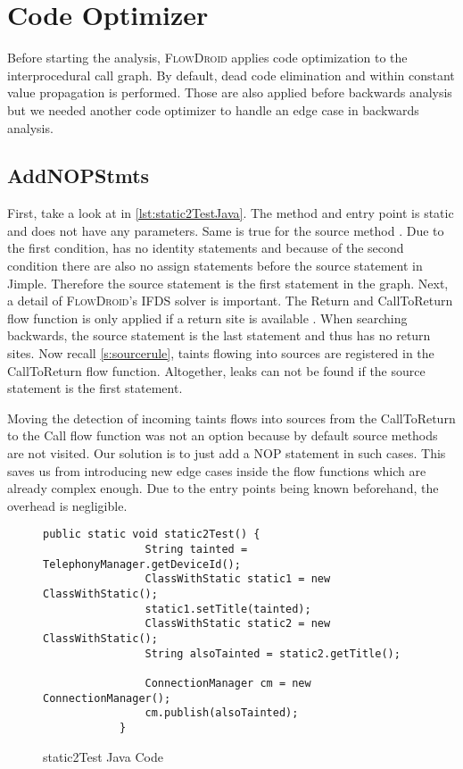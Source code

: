 \documentclass[../draft.tex]{subfiles}
\begin{document}
    \section{Code Optimizer}
    Before starting the analysis, \textsc{FlowDroid} applies code optimization to the interprocedural call graph. By default, dead code elimination and within constant value propagation is performed. Those are also applied before backwards analysis but we needed another code optimizer to handle an edge case in backwards analysis.

    \subsection{AddNOPStmts}
    First, take a look at  in \autoref{lst:static2TestJava}. The method and entry point  is static and does not have any parameters. Same is true for the source method . Due to the first condition,  has no identity statements and because of the second  condition there are also no assign statements before the source statement in Jimple. Therefore the source statement is the first statement in the graph. 
    Next, a detail of \textsc{FlowDroid}'s IFDS solver is important. The Return and CallToReturn flow function is only applied if a return site is available \cite{Arzt2017PhD}.
    When searching backwards, the source statement is the last statement and thus has no return sites. Now recall \autoref{s:sourcerule}, taints flowing into sources are registered in the CallToReturn flow function. Altogether, leaks can not be found if the source statement is the first statement.

    Moving the detection of incoming taints flows into sources from the CallToReturn to the Call flow function was not an option because by default source methods are not visited. 
    Our solution is to just add a NOP statement in such cases. This saves us from introducing new edge cases inside the flow functions which are already complex enough. Due to the entry points being known beforehand, the overhead is negligible.

    \begin{figure}
        \centering
        \begin{lstlisting}[gobble=12]
            public static void static2Test() {
                String tainted = TelephonyManager.getDeviceId();
                ClassWithStatic static1 = new ClassWithStatic();
                static1.setTitle(tainted);
                ClassWithStatic static2 = new ClassWithStatic();
                String alsoTainted = static2.getTitle();
                
                ConnectionManager cm = new ConnectionManager();
                cm.publish(alsoTainted);
            }
        \end{lstlisting}
        \caption{static2Test Java Code}
        \label{lst:static2TestJava}
    \end{figure}
\end{document}
